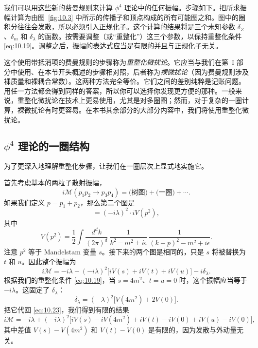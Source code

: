我们可以用这些新的费曼规则来计算 $\phi^4$ 理论中的任何振幅。步骤如下。把所求振幅计算为由图~\ref{fig:10.3} 中所示的传播子和顶点构成的所有可能图之和。图中的圈积分往往会发散，所以必须引入正规化子。这个计算的结果将是三个未知参数 $\delta_Z$、$\delta_m$ 和 $\delta_\lambda$ 的函数。按需要调整（或``重整化''）这三个参数，以保持重整化条件 \eqref{eq:10.19}。调整之后，振幅的表达式应当是有限的并且与正规化子无关。

这个使用带抵消项的费曼规则的步骤称为\emph{重整化微扰论}。它应当与我们在第~I 部分中使用、在本节开头概述的步骤相对照，后者称为\emph{裸微扰论}（因为费曼规则涉及裸质量和裸耦合常数）。这两种方法完全等价。它们之间的差别纯粹是记账问题。用任一方法都会得到同样的答案，所以你可以选择你发现更方便的那种。一般来说，重整化微扰论在技术上更易使用，尤其是对多圈图；然而，对于复杂的一圈计算，裸微扰论有时更容易。在本书其余部分的大部分内容中，我们将使用重整化微扰论。

\subsection{$\phi^4$ 理论的一圈结构}

为了更深入地理解重整化步骤，让我们在一圈层次上显式地实施它。

首先考虑基本的两粒子散射振幅，
\begin{equation}
  i\mathcal{M}(p_1p_2\to p_3p_4) = \text{(树图)} + \text{(一圈)}
    + \cdots .
\end{equation}
如果我们定义 $p = p_1+p_2$，那么第二个图是
\begin{equation}
  = (-i\lambda)^2\cdot iV(p^2) ,
  \label{eq:10.21}
\end{equation}
其中
\begin{equation}
  V(p^2) = \frac{1}{2}\int \frac{d^dk}{(2\pi)^d}\ \frac{1}{k^2-m^2+i\epsilon}\
    \frac{1}{(k+p)^2-m^2+i\epsilon} .
  \label{eq:10.22}
\end{equation}
注意 $p^2$ 等于 Mandelstam 变量 $s$。接下来的两个图是相同的，只是 $s$ 将被替换为 $t$ 和 $u$。因此整个振幅为
\begin{equation}
  i\mathcal{M} = -i\lambda + (-i\lambda)^2\bigl[ iV(s) + iV(t) + iV(u) \bigr]
    - i\delta_\lambda .
  \label{eq:10.23}
\end{equation}
根据我们的重整化条件 \eqref{eq:10.19}，当 $s = 4m^2$、$t = u = 0$ 时，这个振幅应当等于 $-i\lambda$。这固定了 $\delta_\lambda$：
\begin{equation}
  \delta_\lambda = (-\lambda)^2\bigl[ V(4m^2) + 2V(0) \bigr] .
  \label{eq:10.24}
\end{equation}
把它代回 \eqref{eq:10.23}，我们得到有限的结果
\begin{equation}
  i\mathcal{M} = -i\lambda + (-i\lambda)^2\bigl[ iV(s) - iV(4m^2)
    + iV(t) - iV(0) + iV(u) - iV(0) \bigr] ,
\end{equation}
其中差值 $V(s) - V(4m^2)$ 和 $V(t) - V(0)$ 是有限的，因为发散与外动量无关。

